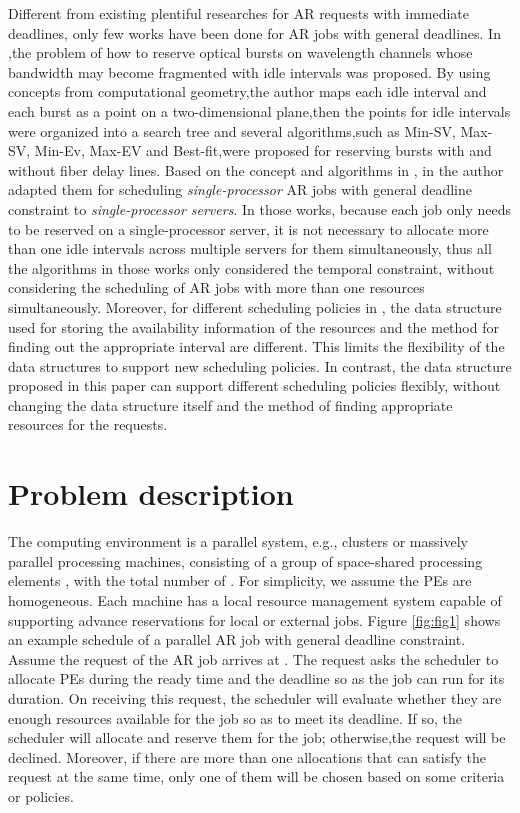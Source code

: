 \documentclass[preprint,12pt]{elsarticle}
\begin{document}
Different from existing plentiful researches for AR requests with immediate deadlines, only few works have been done for AR jobs with general deadlines. In \cite{xu2004efficient},the problem of how to reserve optical bursts on wavelength channels whose bandwidth may become fragmented with idle intervals was proposed. By using concepts from computational geometry,the author maps each idle interval and each burst as a point on a two-dimensional plane,then the points for idle intervals were organized into a search tree and several algorithms,such as
Min-SV, Max-SV, Min-Ev, Max-EV and Best-fit,were proposed for reserving bursts with and without fiber delay lines. Based on the concept and algorithms in \cite{xu2004efficient}, in \cite{castillo2011online,castillo2007design}
the author adapted them for scheduling \emph{single-processor} AR jobs with general deadline constraint to  \emph{single-processor servers}. In those works, because each job only needs to be reserved on a single-processor server, it is not necessary to allocate more than one idle intervals across multiple servers for them simultaneously, thus all the algorithms in those works only considered the temporal constraint, without considering the scheduling of AR jobs with more than one resources simultaneously. Moreover, for different scheduling policies in \cite{castillo2011online,castillo2007design}, the data structure used for storing the availability information of the resources and the method for finding out the appropriate interval are different. This limits the flexibility of the data structures to support new scheduling policies. In contrast, the data structure proposed in this paper can support different scheduling policies flexibly, without changing the data structure itself and the method of finding appropriate resources for the requests.


\section{Problem description}
\label{sec:model}
The computing environment is a parallel system, e.g., clusters or massively parallel processing machines, consisting of a group of space-shared processing elements , with the total number of . For simplicity, we assume the PEs are homogeneous. Each machine has a local resource management system capable of supporting advance reservations for local or external jobs.
Figure \ref{fig:fig1} shows an example schedule of a parallel AR job with general deadline constraint. Assume the request of the AR job arrives at . The request asks the scheduler to allocate PEs during the ready time and the deadline so as the job can run for its duration. On receiving this request, the scheduler will evaluate  whether they are enough resources available for the job so as to meet its deadline. If so, the scheduler will allocate and reserve them for the job; otherwise,the request will be declined. Moreover, if there are more than one allocations that can satisfy the request at the same time, only one of them will be chosen based on some criteria or policies.
\end{document}
